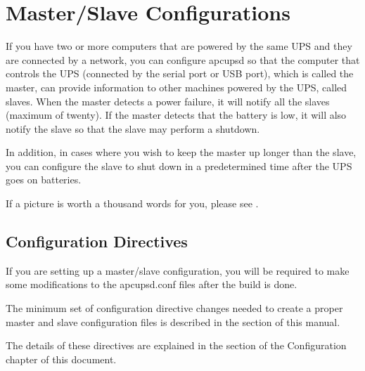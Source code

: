{{{{{{{{\label{Master_002fSlave-Configurations}

\section*{Master/Slave Configurations}

\label{index-Master_002fSlave-152}
If you have two or more computers that are powered by the same UPS and they
are connected by a network, you can configure apcupsd so that the computer
that controls the UPS (connected by the serial port or USB port), which is
called the master, can provide information to other machines powered by the
UPS, called slaves. When the master detects a power failure, it will notify
all the slaves (maximum of twenty). If the master detects that the battery is
low, it will also notify the slave so that the slave may perform a shutdown.  

In addition, in cases where you wish to keep the master up longer than the
slave, you can configure the slave to shut down in a predetermined time after
the UPS goes on batteries.  

If a picture is worth a thousand words for you, please see 
. 

\label{Configuration-Directives}

\subsection*{Configuration Directives}

\label{index-Directives-153}
\label{index-Configuration_002c-Directives-154}
If you are setting up a master/slave configuration, you will be required to
make some modifications to the apcupsd.conf files after the build is done.  

The minimum set of configuration directive changes needed to create a proper
master and slave configuration files is described in the 
 section of
this manual.  

The details of these directives are explained in the 
 section of the
Configuration chapter of this document.  

}}}}}}}}
